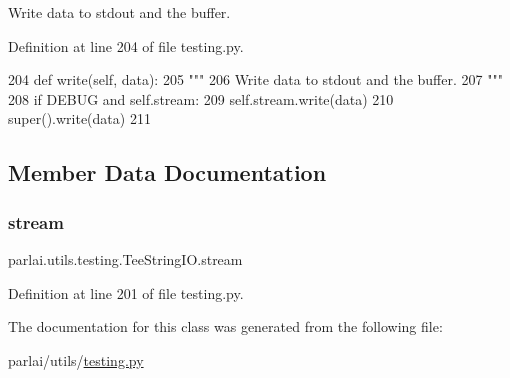 \begin{DoxyVerb}Write data to stdout and the buffer.
\end{DoxyVerb}
 

Definition at line 204 of file testing.\+py.


\begin{DoxyCode}
204     \textcolor{keyword}{def }write(self, data):
205         \textcolor{stringliteral}{"""}
206 \textcolor{stringliteral}{        Write data to stdout and the buffer.}
207 \textcolor{stringliteral}{        """}
208         \textcolor{keywordflow}{if} DEBUG \textcolor{keywordflow}{and} self.stream:
209             self.stream.write(data)
210         super().write(data)
211 
\end{DoxyCode}


\subsection{Member Data Documentation}
\mbox{\label{classparlai_1_1utils_1_1testing_1_1TeeStringIO_a4dc6e50f503b4679fe3b3fa0ebd729f1}} 
\subsubsection{\texorpdfstring{stream}{stream}}
{\footnotesize\ttfamily parlai.\+utils.\+testing.\+Tee\+String\+I\+O.\+stream}



Definition at line 201 of file testing.\+py.



The documentation for this class was generated from the following file\+:\begin{DoxyCompactItemize}
\item 
parlai/utils/\hyperlink{testing_8py}{testing.\+py}\end{DoxyCompactItemize}

